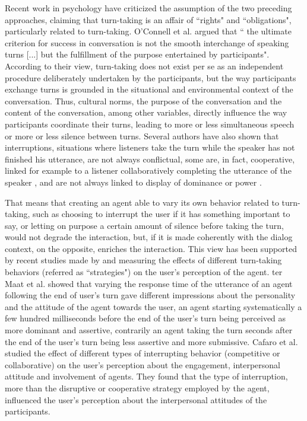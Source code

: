 Recent work in psychology have criticized
the assumption of the two preceding approaches, claiming that turn-taking is an affair of ``rights" and ``obligations", particularly related to turn-taking. O'Connell et al.\citep{oconnell_turn-taking_1990} argued that `` the ultimate criterion for success in conversation is not the smooth interchange of speaking
turns [...] but the fulfillment of the purpose entertained
by participants". According to their view, turn-taking
does not exist per se as an independent procedure deliberately
undertaken by the participants, but the way
participants exchange turns is grounded in the situational
and environmental context of the conversation.
Thus, cultural norms, the purpose of the conversation
and the content of the conversation, among other variables,
directly influence the way participants coordinate
their turns, leading to more or less simultaneous speech
or more or less silence between turns. Several authors
have also shown that interruptions, situations where listeners
take the turn while the speaker has not finished his
utterance, are not always conflictual, some are, in fact,
cooperative, linked for example to a listener collaboratively
completing the utterance of the speaker \citep{clancy_co-constructed_2015}, and
are not always linked to display of dominance or power
\citep{goldberg_interrupting_1990}.

That means that creating an agent able to vary its
own behavior related to turn-taking, such as choosing to
interrupt the user if it has something important to say,
or letting on purpose a certain amount of silence before
taking the turn, would not degrade the interaction, but,
if it is made coherently with the dialog context, on the
opposite, enriches the interaction. This view has been
supported by recent studies made by \citep{ter_maat_how_2010} and \citep{cafaro_effects_2016} measuring
the effects of different turn-taking behaviors (referred as ``strategies") on
the user's perception of the agent.
ter Maat et al.\citep{ter_maat_how_2010} showed that varying the response time of the utterance of an agent following the end of user's turn gave different impressions about the personality and the attitude of the agent towards the user, an agent starting systematically a few hundred milliseconds before the end of the user's turn being perceived as more dominant and assertive, contrarily an agent taking the turn seconds after the end of the user's turn being less assertive and more submissive.  
Cafaro et al.\citep{cafaro_effects_2016} studied the effect of different types of interrupting
behavior (competitive or collaborative) on the user's
perception about the engagement, interpersonal attitude
and involvement of agents. They found that the type of interruption, more than
the disruptive or cooperative strategy employed by the
agent, influenced the user's perception about the interpersonal
attitudes of the participants.
 
